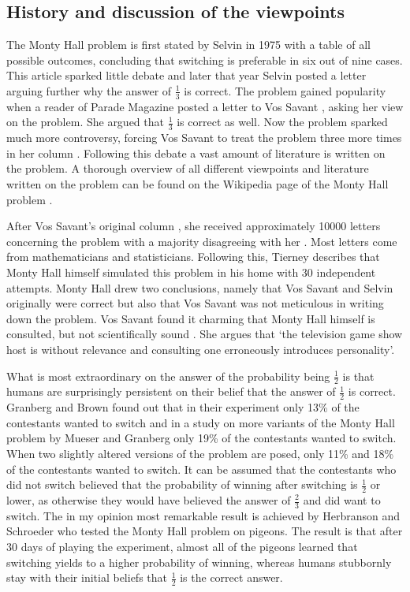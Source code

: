 \documentclass[a4paper]{report}
\theoremstyle{plain}
\theoremstyle{definition}
\theoremstyle{remark}
\numberwithin{equation}{chapter}
\DeclareMathOperator{\1}{\mathbbm{1}}
\begin{document}
\subsection{History and discussion of the viewpoints}
The Monty Hall problem is first stated by Selvin in 1975 \cite{Selvin75a} with a table of all possible outcomes, concluding that switching is preferable in six out of nine cases. This article sparked little debate and later that year Selvin \cite{Selvin75b} posted a letter arguing further why the answer of $\frac{1}{3}$ is correct. The problem gained popularity when a reader of Parade Magazine posted a letter to Vos Savant \cite{Marilyn90a}, asking her view on the problem. She argued that $\frac{1}{3}$ is correct as well. Now the problem sparked much more controversy, forcing Vos Savant to treat the problem three more times in her column \cite{Marilyn90b,Marilyn91a,Marilyn91b}. Following this debate a vast amount of literature is written on the problem. A thorough overview of all different viewpoints and literature written on the problem can be found on the Wikipedia page of the Monty Hall problem \cite{WikiMonty}.

After Vos Savant's original column \cite{Marilyn90a}, she received approximately 10000 letters concerning the problem with a majority disagreeing with her \cite{Tierney91}. Most letters come from mathematicians and statisticians. Following this, Tierney \cite{Tierney91} describes that Monty Hall himself simulated this problem in his home with 30 independent attempts. Monty Hall drew two conclusions, namely that Vos Savant and Selvin originally were correct but also that Vos Savant was not meticulous in writing down the problem. Vos Savant found it charming that Monty Hall himself is consulted, but not scientifically sound \cite{Savant91c}. She argues that `the television game show host is without relevance and consulting one erroneously introduces personality'.

What is most extraordinary on the answer of the probability being $\frac{1}{2}$ is that humans are surprisingly persistent on their belief that the answer of $\frac{1}{2}$ is correct. Granberg and Brown \cite{Granberg95} found out that in their experiment only 13\% of the contestants wanted to switch and in a study on more variants of the Monty Hall problem by Mueser and Granberg \cite{Mueser99} only 19\% of the contestants wanted to switch. When two slightly altered versions of the problem are posed, only 11\% and 18\% of the contestants wanted to switch. It can be assumed that the contestants who did not switch believed that the probability of winning after switching is $\frac{1}{2}$ or lower, as otherwise they would have believed the answer of $\frac{2}{3}$ and did want to switch. The in my opinion most remarkable result is achieved by Herbranson and Schroeder \cite{Herbranson10} who tested the Monty Hall problem on pigeons. The result is that after 30 days of playing the experiment, almost all of the pigeons learned that switching yields to a higher probability of winning, whereas humans stubbornly stay with their initial beliefs that $\frac{1}{2}$ is the correct answer.
\end{document}
